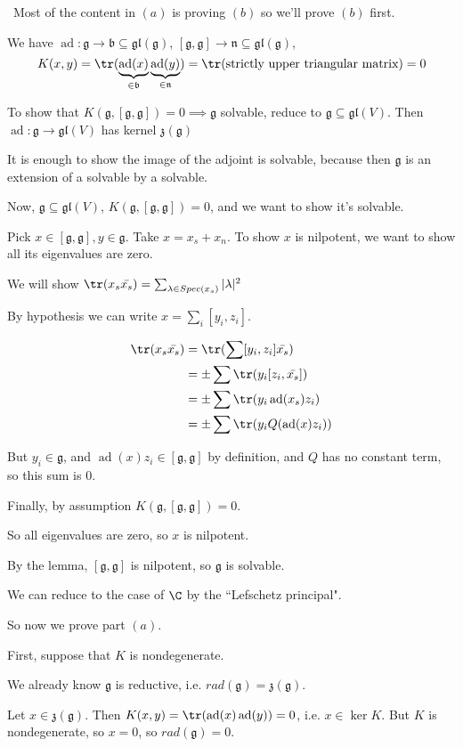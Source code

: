 \documentclass[x11names,reqno,14pt]{extarticle}
\newcommand{\mk}[1]{\mathfrak{#1}}
\newcommand{\g}{\mk{g}}
\newcommand{\rad}{rad}
\DeclareMathOperator{\ad}{ad}
\newcommand{\gl}{\mk{g}\mk{l}}
\begin{document}
\,
Most of the content in $(a)$ is proving $(b)$ so we'll prove $(b)$ first. 

We have $\ad:\g\to\mk{b}\subseteq \gl(\g)$, $[\g,\g]\to\mk{n} \subseteq \gl(\g)$, 
\[
K(x,y) = \tr(\underbrace{\ad(x)}_{\in\mk{b}}\underbrace{\ad(y)}_{\in\mk{n}}) = \tr(\text{strictly upper triangular matrix}) = 0
\]

To show that $K(\g,[\g,\g]) = 0\implies\g$ solvable, reduce to $\g \subseteq\gl(V)$. Then $\ad:\g\to\gl(V)$ has kernel $\mk{z}(\g)$

It is enough to show the image of the adjoint is solvable, because then $\g$ is an extension of a solvable by a solvable. 

Now, $\g \subseteq \gl(V)$, $K(\g,[\g,\g]) = 0$, and we want to show it's solvable. 

Pick $x \in [\g,\g], y \in \g$. Take $x = x_s + x_n$. To show $x$ is nilpotent, we want to show all its eigenvalues are zero. 

We will show $\tr(x_s\bar{x_s}) = \sum_{\lambda\in Spec(x_s)}|\lambda|^2$

By hypothesis we can write $x = \sum_i[y_i,z_i]$. 

\begin{align*}
\tr(x_s\bar{x_s}) & = \tr(\sum[y_i,z_i]\bar{x_s}) \\
& = \pm\sum\tr(y_i[z_i,\bar{x_s}]) \\
& = \pm\sum\tr(y_i\ad(x_s)z_i) \\
& = \pm \sum\tr(y_iQ(\ad(x)z_i))
\end{align*} 

But $y_i \in \g$, and $\ad(x)z_i \in [\g,\g]$ by definition, and $Q$ has no constant term, so this sum is 0. 

Finally, by assumption $K(\g,[\g,\g]) = 0$. 

So all eigenvalues are zero, so $x$ is nilpotent. 

By the lemma, $[\g,\g]$ is nilpotent, so $\g$ is solvable. 

We can reduce to the case of $\C$ by the ``Lefschetz principal". 

So now we prove part $(a)$. 

First, suppose that $K$ is nondegenerate. 

We already know $\g$ is reductive, i.e. $\rad(\g) = \mk{z}(\g)$. 

Let $x \in \mk{z}(\g)$. Then $K(x,y) = \tr(\ad(x)\ad(y)) = 0$, i.e. $x \in \ker K$. But $K$ is nondegenerate, so $x = 0$, so $\rad(\g) = 0$. 
\end{document}
